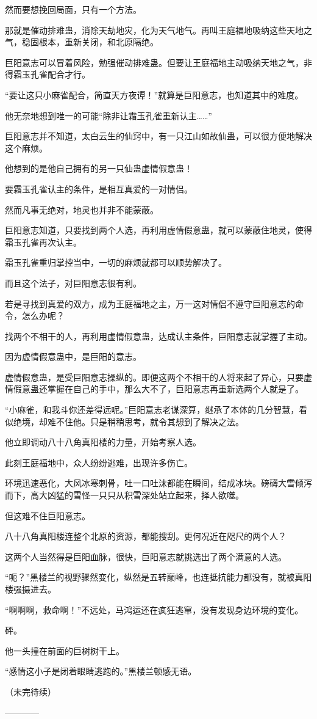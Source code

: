 \begin{this_body}
然而要想挽回局面，只有一个方法。

那就是催动排难蛊，消除天劫地灾，化为天气地气。再叫王庭福地吸纳这些天地之气，稳固根本，重新关闭，和北原隔绝。

巨阳意志可以冒着风险，勉强催动排难蛊。但要让王庭福地主动吸纳天地之气，非得霜玉孔雀配合才行。

“要让这只小麻雀配合，简直天方夜谭！”就算是巨阳意志，也知道其中的难度。

他无奈地想到唯一的可能“除非让霜玉孔雀重新认主……”

巨阳意志并不知道，太白云生的仙窍中，有一只江山如故仙蛊，可以很方便地解决这个麻烦。

他想到的是他自己拥有的另一只仙蛊虚情假意蛊！

要霜玉孔雀认主的条件，是相互真爱的一对情侣。

然而凡事无绝对，地灵也并非不能蒙蔽。

巨阳意志知道，只要找到两个人选，再利用虚情假意蛊，就可以蒙蔽住地灵，使得霜玉孔雀再次认主。

霜玉孔雀重归掌控当中，一切的麻烦就都可以顺势解决了。

而且这个法子，对巨阳意志很有利。

若是寻找到真爱的双方，成为王庭福地之主，万一这对情侣不遵守巨阳意志的命令，怎么办呢？

找两个不相干的人，再利用虚情假意蛊，达成认主条件，巨阳意志就掌握了主动。

因为虚情假意蛊中，是巨阳的意志。

虚情假意蛊，是受巨阳意志操纵的。即便这两个不相干的人将来起了异心，只要虚情假意蛊还掌握在自己的手中，那么大不了，巨阳意志再重新选两个人就是了。

“小麻雀，和我斗你还差得远呢。”巨阳意志老谋深算，继承了本体的几分智慧，看似绝境，却难不住他。只是稍稍思考，就令其想到了解决之法。

他立即调动八十八角真阳楼的力量，开始考察人选。

此刻王庭福地中，众人纷纷逃难，出现许多伤亡。

环境迅速恶化，大风冰寒刺骨，吐一口吐沫都能在瞬间，结成冰块。磅礴大雪倾泻而下，高大凶猛的雪怪一只只从积雪深处站立起来，择人欲噬。

但这难不住巨阳意志。

八十八角真阳楼连整个北原的资源，都能搜刮。更何况近在咫尺的两个人？

这两个人当然得是巨阳血脉，很快，巨阳意志就挑选出了两个满意的人选。

“呃？”黑楼兰的视野骤然变化，纵然是五转巅峰，也连抵抗能力都没有，就被真阳楼强摄进去。

“啊啊啊，救命啊！”不远处，马鸿运还在疯狂逃窜，没有发现身边环境的变化。

砰。

他一头撞在前面的巨树树干上。

“感情这小子是闭着眼睛逃跑的。”黑楼兰顿感无语。

（未完待续）

------------

\end{this_body}

